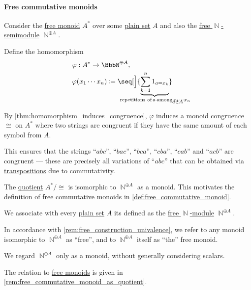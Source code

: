 \paragraph{Free commutative monoids}

\begin{remark}\label{rem:free_commutative_monoid_as_quotient}
  Consider the \hyperref[def:free_monoid]{free monoid} \( A^* \) over some \hyperref[def:set]{plain set} \( A \) and also the \hyperref[def:free_semimodule]{free \( \BbbN \)-semimodule} \( \BbbN^{\oplus A} \).

  Define the homomorphism
  \begin{equation*}
    \begin{aligned}
      &\varphi: A^* \to \BbbN^{\oplus A}, \\
      &\varphi(x_1 \cdots x_n) \coloneqq \seq[\Big]{ \underbrace{\sum_{k=1}^n 1_{a = x_k}}_{\mathclap{\T*{repetitions of} a \T*{among} x_1 \cdots x_n} }}_{a \in A}
    \end{aligned}
  \end{equation*}

  By \cref{thm:homomorphism_induces_congruence}, \( \varphi \) induces a \hyperref[def:first_order_congruence]{monoid congruence} \( \cong \) on \( A^* \) where two strings are congruent if they have the same amount of each symbol from \( A \).

  This ensures that the strings \enquote{\( abc \)}, \enquote{\( bac \)}, \enquote{\( bca \)}, \enquote{\( cba \)}, \enquote{\( cab \)} and \enquote{\( acb \)} are congruent --- these are precisely all variations of \enquote{\( abc \)} that can be obtained via \hyperref[def:transposition]{transpositions} due to commutativity.

  The \hyperref[def:first_order_quotient]{quotient} \( A^* / \cong \) is isomorphic to \( \BbbN^{\oplus A} \) as a monoid. This motivates the definition of free commutative monoids in \cref{def:free_commutative_monoid}.
\end{remark}

\begin{definition}\label{def:free_commutative_monoid}\mimprovised
  We associate with every \hyperref[def:set]{plain set} \( A \) its  defined as the \hyperref[def:free_semimodule]{free \( \BbbN \)-module} \( \BbbN^{\oplus A} \).
\end{definition}
\begin{comments}
  \item In accordance with \cref{rem:free_construction_univalence}, we refer to any monoid isomorphic to \( \BbbN^{\oplus A} \) as \enquote{free}, and to \( \BbbN^{\oplus A} \) itself as \enquote{the} free monoid.

  \item We regard \( \BbbN^{\oplus A} \) only as a monoid, without generally considering scalars.

  \item The relation to \hyperref[def:free_monoid]{free monoids} is given in \cref{rem:free_commutative_monoid_as_quotient}.
\end{comments}

